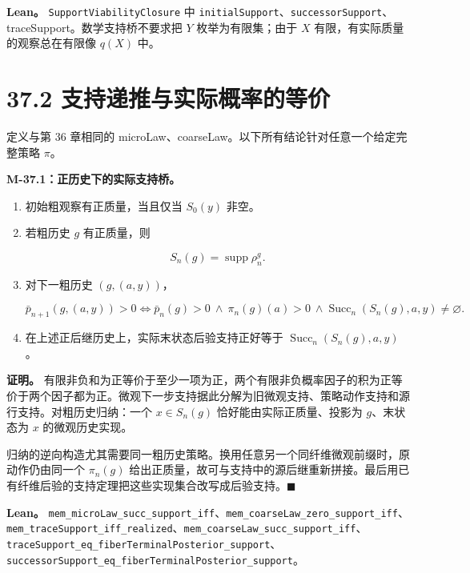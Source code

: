 \documentclass[
  11pt,
  oneside]{book}
\begin{document}
\textbf{Lean。} \nolinkurl{SupportViabilityClosure} 中 \nolinkurl{initialSupport}、\nolinkurl{successorSupport}、traceSupport。数学支持桥不要求把 \(Y\) 枚举为有限集；由于 \(X\) 有限，有实际质量的观察总在有限像 \(q(X)\) 中。

\section{37.2 支持递推与实际概率的等价}\label{ux652fux6301ux9012ux63a8ux4e0eux5b9eux9645ux6982ux7387ux7684ux7b49ux4ef7}

定义与第 36 章相同的 microLaw、coarseLaw。以下所有结论针对任意一个给定完整策略 \(\pi\)。

\hypertarget{m-37-1}{}\label{m-37-1}

\textbf{M-37.1：正历史下的实际支持桥。}

\begin{enumerate}
\def\labelenumi{\arabic{enumi}.}
\item
  初始粗观察有正质量，当且仅当 \(S_0(y)\) 非空。
\item
  若粗历史 \(g\) 有正质量，则

  \[S_n(g)=\operatorname{supp}\rho_n^g.\]
\item
  对下一粗历史 \((g,(a,y))\)，

  \[\bar p_{n+1}(g,(a,y))>0
  \iff
  \bar p_n(g)>0\ \land\ \pi_n(g)(a)>0\
  \land\operatorname{Succ}_n(S_n(g),a,y)\ne\varnothing.\]
\item
  在上述正后继历史上，实际末状态后验支持正好等于 \(\operatorname{Succ}_n(S_n(g),a,y)\)。
\end{enumerate}

\textbf{证明。} 有限非负和为正等价于至少一项为正，两个有限非负概率因子的积为正等价于两个因子都为正。微观下一步支持据此分解为旧微观支持、策略动作支持和源行支持。对粗历史归纳：一个 \(x\in S_n(g)\) 恰好能由实际正质量、投影为 \(g\)、末状态为 \(x\) 的微观历史实现。

归纳的逆向构造尤其需要同一粗历史策略。换用任意另一个同纤维微观前缀时，原动作仍由同一个 \(\pi_n(g)\) 给出正质量，故可与支持中的源后继重新拼接。最后用已有纤维后验的支持定理把这些实现集合改写成后验支持。\(\blacksquare\)

\textbf{Lean。} \nolinkurl{mem_microLaw_succ_support_iff}、\nolinkurl{mem_coarseLaw_zero_support_iff}、\nolinkurl{mem_traceSupport_iff_realized}、\nolinkurl{mem_coarseLaw_succ_support_iff}、\nolinkurl{traceSupport_eq_fiberTerminalPosterior_support}、\nolinkurl{successorSupport_eq_fiberTerminalPosterior_support}。
\end{document}
